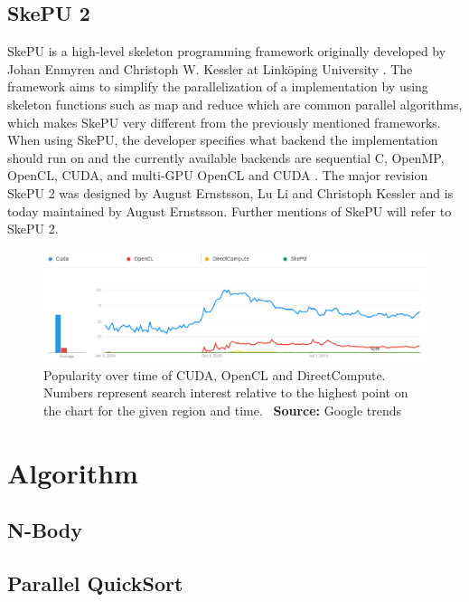 \subsection{SkePU 2}
SkePU is a high-level skeleton programming framework originally developed by Johan Enmyren and Christoph W. Kessler at Linköping University \cite{enmyren2010skepu}. The framework aims to simplify the parallelization of a implementation by using skeleton functions such as map and reduce which are common parallel algorithms, which makes SkePU very different from the previously mentioned frameworks. When using SkePU, the developer specifies what backend the implementation should run on and the currently available backends are sequential C, OpenMP, OpenCL, CUDA, and multi-GPU OpenCL and CUDA \cite{LiUSkePU}. The major revision SkePU 2 was designed by August Ernstsson, Lu Li and Christoph Kessler and is today maintained by August Ernstsson. Further mentions of SkePU will refer to SkePU 2.


\begin{figure}[!htbp]
    \centering
    \includegraphics[width=\textwidth]{Theory/Figs/GoogleTrendsComparison.png}
    \caption{Popularity over time of CUDA, OpenCL and DirectCompute. Numbers represent search interest relative to the highest point on the chart for the given region and time. \ \textbf{Source:} Google trends}
    \label{fig:GoogleTrendsPopularity}
\end{figure}





\section{Algorithm}

\subsection{N-Body}

\subsection{Parallel QuickSort}

